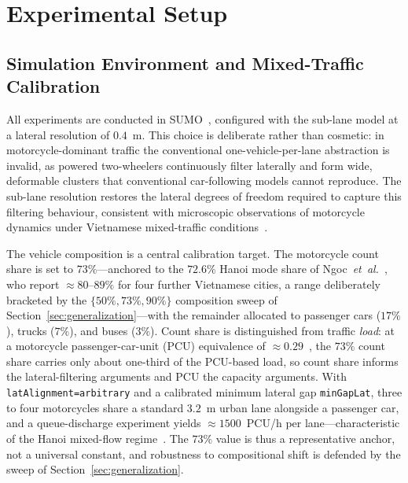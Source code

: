 \section{Experimental Setup}
\label{sec:experimental_setup}

\subsection{Simulation Environment and Mixed-Traffic Calibration}
\label{sec:sim_env}
All experiments are conducted in SUMO~\cite{lopez2018_sumo}, configured with
the sub-lane model at a lateral resolution of $0.4$~m. This choice is deliberate
rather than cosmetic: in motorcycle-dominant traffic the conventional one-vehicle-per-lane
abstraction is invalid, as powered two-wheelers continuously filter laterally and form
wide, deformable clusters that conventional car-following models cannot reproduce. The
sub-lane resolution restores the lateral degrees of freedom required to capture this
filtering behaviour, consistent with microscopic observations of motorcycle dynamics under
Vietnamese mixed-traffic conditions~\cite{vn_roundabout}.

The vehicle composition is a central calibration target. The motorcycle count share is set
to $73\%$---anchored to the $72.6\%$ Hanoi mode share of
Ngoc~\emph{et~al.}~\cite{ngoc2021_fivecities}, who report $\approx 80$--$89\%$ for four
further Vietnamese cities, a range deliberately bracketed by the $\{50\%, 73\%, 90\%\}$
composition sweep of Section~\ref{sec:generalization}---with the remainder allocated to
passenger cars ($17\%$), trucks ($7\%$), and buses ($3\%$). Count share is distinguished
from traffic \emph{load}: at a motorcycle passenger-car-unit (PCU) equivalence of
$\approx 0.29$~\cite{cao_sano_hanoi}, the $73\%$ count share carries only about one-third
of the PCU-based load, so count share informs the lateral-filtering arguments and PCU the
capacity arguments. With \texttt{latAlignment=arbitrary} and a calibrated minimum lateral
gap \texttt{minGapLat}, three to four motorcycles share a standard $3.2$~m urban lane
alongside a passenger car, and a queue-discharge experiment yields $\approx 1500$~PCU/h
per lane---characteristic of the Hanoi mixed-flow regime~\cite{cao_sano_hanoi}. The
$73\%$ value is thus a representative anchor, not a universal constant, and robustness to
compositional shift is defended by the sweep of Section~\ref{sec:generalization}.

